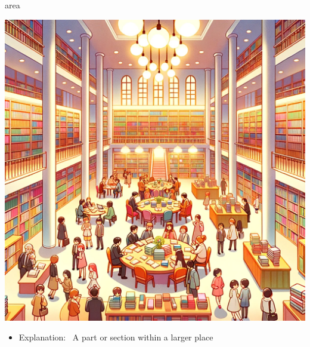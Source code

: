 \documentclass[avery5371, grid,frame]{flashcards}
\begin{document}
\renewcommand{\cardpaper}{a4paper}
\renewcommand{\cardpapermode}{landscape}
\renewcommand{\cardrows}{2}
\renewcommand{\cardcolumns}{2}
\setlength{\cardheight}{3.5in}
\setlength{\cardwidth}{5.0in}
\setlength{\topoffset}{0.65in}
\setlength{\oddoffset}{0.65in}
\setlength{\evenoffset}{0.65in}

\begin{flashcard}{area}
    \vspace*{\fill}
    \begin{center}
        \begin{minipage}[c]{.45\textwidth}
            \includegraphics[width=\textwidth]{cards/a/area/area - A big library with various sections, and people are gathered for reading.png}
        \end{minipage}
        \begin{minipage}[c]{.45\textwidth}
            \begin{itemize}\setlength\itemsep{12pt}
            \item Explanation: \ A part or section within a larger place


\end{itemize}
\end{minipage}
\end{center}
\end{flashcard}
\end{document}
